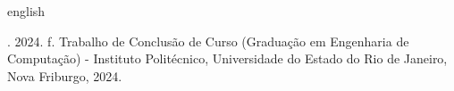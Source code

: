 
\begin{resumo}[Abstract]
\begin{otherlanguage*}{english}
\begin{SingleSpace}

\noindent
\begin{flushleft}
\entradaAutor{}. \textit{\englishTitle{}} 2024.\pageref{LastPage} f. Trabalho de Conclusão de Curso (Graduação em Engenharia de Computação) - Instituto Politécnico, Universidade do Estado do Rio de Janeiro, Nova Friburgo, 2024.
\end{flushleft}
\vspace{\onelineskip}

\setlength{\parindent}{1.3cm}


\end{SingleSpace}
\end{otherlanguage*}
\end{resumo}
